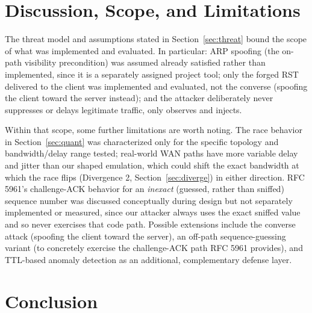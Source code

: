 \documentclass[11pt]{article}
\begin{document}
\section{Discussion, Scope, and Limitations}
\label{sec:discussion}

The threat model and assumptions stated in Section~\ref{sec:threat} bound
the scope of what was implemented and evaluated. In particular: ARP
spoofing (the on-path visibility precondition) was assumed already
satisfied rather than implemented, since it is a separately assigned
project tool; only the forged RST delivered to the client was
implemented and evaluated, not the converse (spoofing the client toward
the server instead); and the attacker deliberately never suppresses or
delays legitimate traffic, only observes and injects.

Within that scope, some further limitations are worth noting. The race
behavior in Section~\ref{sec:quant} was characterized only for the
specific topology and bandwidth/delay range tested; real-world WAN paths
have more variable delay and jitter than our shaped emulation, which
could shift the exact bandwidth at which the race flips (Divergence 2,
Section~\ref{sec:diverge}) in either direction. RFC 5961's challenge-ACK
behavior for an \emph{inexact} (guessed, rather than sniffed) sequence
number was discussed conceptually during design but not separately
implemented or measured, since our attacker always uses the exact
sniffed value and so never exercises that code path. Possible
extensions include the converse attack (spoofing the client toward the
server), an off-path sequence-guessing variant (to concretely exercise
the challenge-ACK path RFC 5961 provides), and TTL-based anomaly
detection as an additional, complementary defense layer.

\section{Conclusion}
\label{sec:conclusion}
\end{document}
